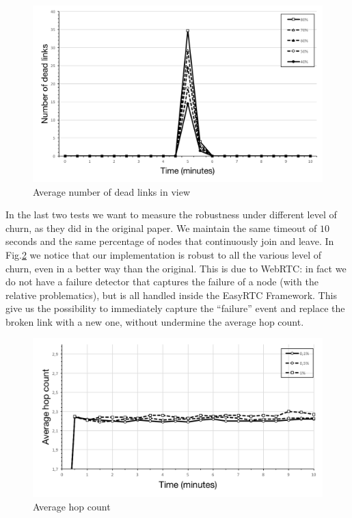 \begin{figure}[ht]
  \centering
  \includegraphics[keepaspectratio=true, width=\textwidth]{images/average_dead_links}\caption{Average number of dead links in view}
  \label{fig:average_dead_links}
\end{figure}

In the last two tests we want to measure the robustness under different level of churn, as they did in the original paper. We maintain the same timeout of $10$ seconds and the same percentage of nodes that continuously join and leave. In Fig.\ref{fig:average_hop_count_churn} we notice that our implementation is robust to all the various level of churn, even in a better way than the original. This is due to WebRTC: in fact we do not have a failure detector that captures the failure of a node (with the relative problematics), but is all handled inside the EasyRTC Framework. This give us the possibility to immediately capture the ``failure'' event and replace the broken link with a new one, without undermine the average hop count. 


\begin{figure}[ht]
  \centering
  \includegraphics[keepaspectratio=true, width=\textwidth]{images/average_hop_count_churn}\caption{Average hop count}
  \label{fig:average_hop_count_churn}
\end{figure}
